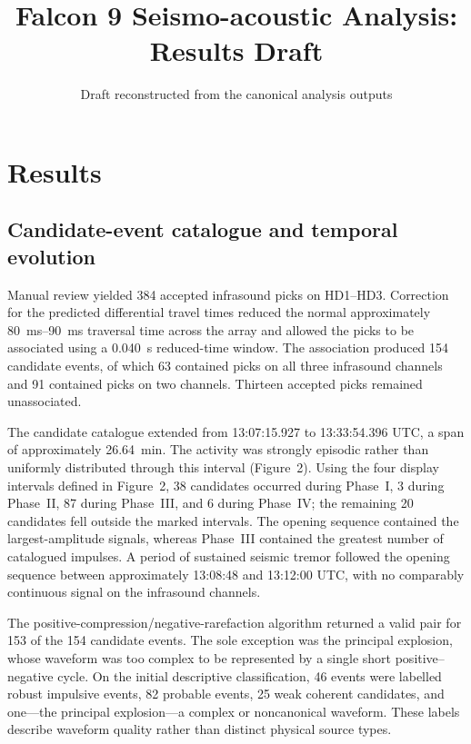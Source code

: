 \documentclass[12pt]{article}
\title{Falcon 9 Seismo-acoustic Analysis: Results Draft}
\author{}
\date{Draft reconstructed from the canonical analysis outputs}
\begin{document}
\maketitle

\section{Results}

\subsection{Candidate-event catalogue and temporal evolution}

Manual review yielded 384 accepted infrasound picks on HD1--HD3. Correction for
the predicted differential travel times reduced the normal approximately
\SIrange{80}{90}{\milli\second} traversal time across the array and allowed the
picks to be associated using a \SI{0.040}{\second} reduced-time window. The
association produced 154 candidate events, of which 63 contained picks on all
three infrasound channels and 91 contained picks on two channels. Thirteen
accepted picks remained unassociated.

The candidate catalogue extended from 13:07:15.927 to 13:33:54.396 UTC, a span
of approximately \SI{26.64}{\minute}. The activity was strongly episodic rather
than uniformly distributed through this interval (Figure~2). Using the four
display intervals defined in Figure~2, 38 candidates occurred during Phase~I,
3 during Phase~II, 87 during Phase~III, and 6 during Phase~IV; the remaining 20
candidates fell outside the marked intervals. The opening sequence contained the
largest-amplitude signals, whereas Phase~III contained the greatest number of
catalogued impulses. A period of sustained seismic tremor followed the opening
sequence between approximately 13:08:48 and 13:12:00 UTC, with no comparably
continuous signal on the infrasound channels.

The positive-compression/negative-rarefaction algorithm returned a valid pair
for 153 of the 154 candidate events. The sole exception was the principal
explosion, whose waveform was too complex to be represented by a single short
positive--negative cycle. On the initial descriptive classification, 46 events
were labelled robust impulsive events, 82 probable events, 25 weak coherent
candidates, and one---the principal explosion---a complex or noncanonical
waveform. These labels describe waveform quality rather than distinct physical
source types.
\end{document}
